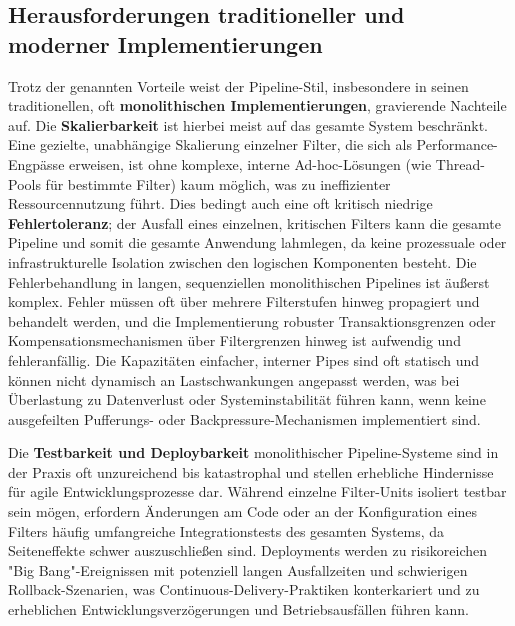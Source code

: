 \documentclass[10pt]{article}
\begin{document}
\begin{multicols}{2}
\subsection{Herausforderungen traditioneller und moderner Implementierungen}
Trotz der genannten Vorteile weist der Pipeline-Stil, insbesondere in seinen traditionellen, oft \textbf{monolithischen Implementierungen}, gravierende Nachteile auf. Die \textbf{Skalierbarkeit} ist hierbei meist auf das gesamte System beschränkt. Eine gezielte, unabhängige Skalierung einzelner Filter, die sich als Performance-Engpässe erweisen, ist ohne komplexe, interne Ad-hoc-Lösungen (wie Thread-Pools für bestimmte Filter) kaum möglich, was zu ineffizienter Ressourcennutzung führt.\cite{tradeoffs_monolithic_db} Dies bedingt auch eine oft kritisch niedrige \textbf{Fehlertoleranz}; der Ausfall eines einzelnen, kritischen Filters kann die gesamte Pipeline und somit die gesamte Anwendung lahmlegen, da keine prozessuale oder infrastrukturelle Isolation zwischen den logischen Komponenten besteht.\cite{richards2020} Die Fehlerbehandlung in langen, sequenziellen monolithischen Pipelines ist äußerst komplex. Fehler müssen oft über mehrere Filterstufen hinweg propagiert und behandelt werden, und die Implementierung robuster Transaktionsgrenzen oder Kompensationsmechanismen über Filtergrenzen hinweg ist aufwendig und fehleranfällig. Die Kapazitäten einfacher, interner Pipes sind oft statisch und können nicht dynamisch an Lastschwankungen angepasst werden, was bei Überlastung zu Datenverlust oder Systeminstabilität führen kann, wenn keine ausgefeilten Pufferungs- oder Backpressure-Mechanismen implementiert sind.

Die \textbf{Testbarkeit und Deploybarkeit} monolithischer Pipeline-Systeme sind in der Praxis oft unzureichend bis katastrophal und stellen erhebliche Hindernisse für agile Entwicklungsprozesse dar. Während einzelne Filter-Units isoliert testbar sein mögen, erfordern Änderungen am Code oder an der Konfiguration eines Filters häufig umfangreiche Integrationstests des gesamten Systems, da Seiteneffekte schwer auszuschließen sind. Deployments werden zu risikoreichen "Big Bang"-Ereignissen mit potenziell langen Ausfallzeiten und schwierigen Rollback-Szenarien, was Continuous-Delivery-Praktiken konterkariert und zu erheblichen Entwicklungsverzögerungen und Betriebsausfällen führen kann.\cite{devzero_monolith_microservices}


\end{multicols}
\end{document}
